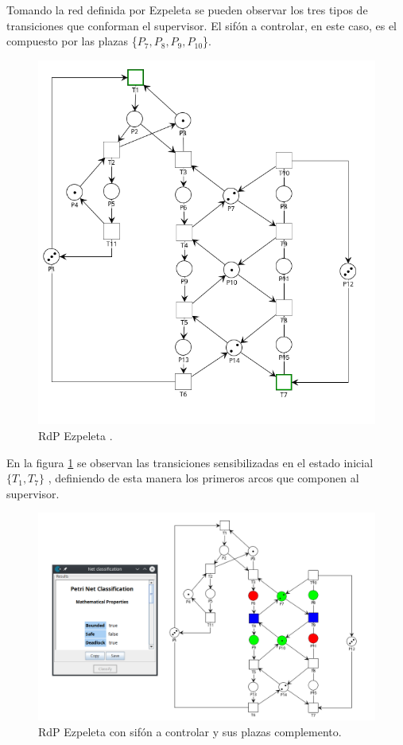 Tomando la red definida por Ezpeleta se pueden observar los tres tipos de transiciones que conforman el supervisor. El sifón a controlar, en este caso, es el compuesto por las plazas \{$P_7,P_8,P_9,P_{10}$\}.

 \begin{figure}[H]
	\centering
	\includegraphics[width=\textwidth]{Figures/algoritmo3/desarrollo/ezpeleta1.png}
	\caption[RdP Ezpeleta.]{RdP Ezpeleta \footnotemark .}
	\label{fig:fig3.5}
  \end{figure} 

En la figura \ref{fig:fig3.5} se observan las transiciones sensibilizadas en el estado inicial $\{T_1,T_7\}$ , definiendo de esta manera los primeros arcos que componen al supervisor.  
  
 \begin{figure}[H]
	\centering
	\includegraphics[width=\textwidth]{Figures/algoritmo3/desarrollo/ezpeleta2.png}
	\caption{RdP Ezpeleta con sifón a controlar y sus plazas complemento.}
	\label{fig:fig3.6}
  \end{figure}

